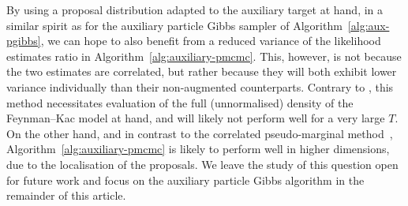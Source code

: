 By using a proposal distribution adapted to the auxiliary target at hand, in a similar spirit as for the auxiliary particle Gibbs sampler of Algorithm~\ref{alg:aux-pgibbs}, we can hope to also benefit from a reduced variance of the likelihood estimates ratio in Algorithm~\ref{alg:auxiliary-pmcmc}. This, however, is not because the two estimates are correlated, but rather because they will both exhibit lower variance individually than their non-augmented counterparts.
Contrary to \citet{Deligiannidis2018correlated}, this method necessitates evaluation of the full (unnormalised) density of the Feynman--Kac model at hand, and will likely not perform well for a very large $T$. On the other hand, and in contrast to the correlated pseudo-marginal method~\citep[see the comments in Theorem 3 and Section 5.3]{Deligiannidis2018correlated}, Algorithm~\ref{alg:auxiliary-pmcmc} is likely to perform well in higher dimensions, due to the localisation of the proposals. We leave the study of this question open for future work and focus on the auxiliary particle Gibbs algorithm in the remainder of this article.
